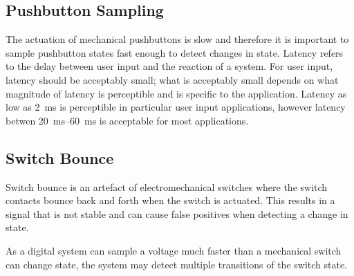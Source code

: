 \documentclass{report}
\begin{document}
\subsection{Pushbutton Sampling}
The actuation of mechanical pushbuttons is slow and therefore it is important to sample pushbutton states fast enough to detect changes in state.
Latency refers to the delay between user input and the reaction of a system. For user input, latency should be acceptably small;
what is acceptably small depends on what magnitude of latency is perceptible and is specific to the application.
Latency as low as \qty{2}{ms} is perceptible in particular user input applications, however latency betwen \qtyrange{20}{60}{ms} is acceptable for most applications.
\subsection{Switch Bounce}
Switch bounce is an artefact of electromechanical switches where the switch contacts bounce back and forth when the switch is actuated.
This results in a signal that is not stable and can cause false positives when detecting a change in state.

As a digital system can sample a voltage much faster than a mechanical switch can change state, the system may detect multiple
transitions of the switch state.
\end{document}
